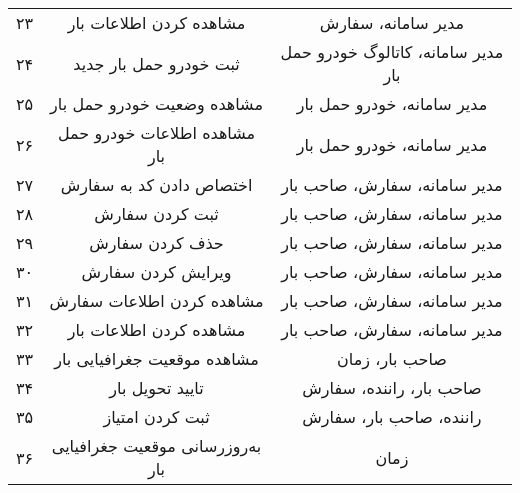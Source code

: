 \begin{table}[hb]
\begin{tabular}{|c|c|c|}
	۲۳ & مشاهده کردن اطلاعات بار & مدیر سامانه، سفارش \\
	۲۴ & ثبت خودرو حمل بار جدید & مدیر سامانه، کاتالوگ خودرو حمل بار \\
	۲۵ & مشاهده وضعیت خودرو حمل بار & مدیر سامانه، خودرو حمل بار \\
	۲۶ & مشاهده اطلاعات خودرو حمل بار & مدیر سامانه، خودرو حمل بار \\
	۲۷ & اختصاص دادن کد به سفارش & مدیر سامانه، سفارش، صاحب بار \\
	۲۸ & ثبت کردن سفارش & مدیر سامانه، سفارش، صاحب بار \\
	۲۹ & حذف کردن سفارش & مدیر سامانه، سفارش، صاحب بار \\
	۳۰ & ویرایش کردن سفارش & مدیر سامانه، سفارش،‌ صاحب بار \\
	۳۱ & مشاهده کردن اطلاعات سفارش & مدیر سامانه، سفارش، صاحب بار \\
	۳۲ & مشاهده کردن اطلاعات بار & مدیر سامانه، سفارش، صاحب بار \\
	۳۳ & مشاهده موقعیت جغرافیایی بار & صاحب بار، زمان \\
	۳۴ & تایید تحویل بار & صاحب بار، راننده، سفارش \\
	۳۵ & ثبت کردن امتیاز & راننده، صاحب بار، سفارش \\
	۳۶ & به‌روزرسانی موقعیت جغرافیایی بار & زمان \\
	\end{tabular}
\end{table}
